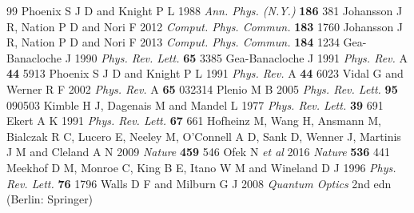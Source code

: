 \documentclass[12pt]{iopart}
\begin{document}
\begin{thebibliography}{99}
 Phoenix S J D and Knight P L 1988 {\it Ann. Phys. (N.Y.)} {\bf 186} 381
 Johansson J R, Nation P D and Nori F 2012 {\it Comput. Phys. Commun.} {\bf 183} 1760
 Johansson J R, Nation P D and Nori F 2013 {\it Comput. Phys. Commun.} {\bf 184} 1234
 Gea-Banacloche J 1990 {\it Phys. Rev. Lett.} {\bf 65} 3385
 Gea-Banacloche J 1991 {\it Phys. Rev.} A {\bf 44} 5913
 Phoenix S J D and Knight P L 1991 {\it Phys. Rev.} A {\bf 44} 6023
 Vidal G and Werner R F 2002 {\it Phys. Rev.} A {\bf 65} 032314
 Plenio M B 2005 {\it Phys. Rev. Lett.} {\bf 95} 090503
 Kimble H J, Dagenais M and Mandel L 1977 {\it Phys. Rev. Lett.} {\bf 39} 691
 Ekert A K 1991 {\it Phys. Rev. Lett.} {\bf 67} 661
 Hofheinz M, Wang H, Ansmann M, Bialczak R C, Lucero E, Neeley M, O'Connell A D, Sank D, Wenner J, Martinis J M and Cleland A N 2009 {\it Nature} {\bf 459} 546
 Ofek N {\it et al} 2016 {\it Nature} {\bf 536} 441
 Meekhof D M, Monroe C, King B E, Itano W M and Wineland D J 1996 {\it Phys. Rev. Lett.} {\bf 76} 1796
 Walls D F and Milburn G J 2008 {\it Quantum Optics} 2nd edn (Berlin: Springer)
\end{thebibliography}
\end{document}
